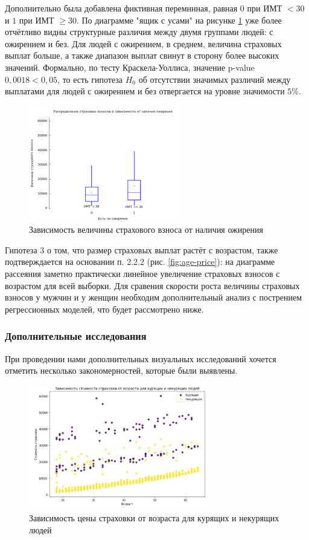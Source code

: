 \documentclass[a4paper,12pt]{article}
\begin{document}
Дополнительно была добавлена фиктивная перемннная, равная $0$ при ИМТ $<30$ и $1$ при ИМТ $\ge30$. По диаграмме "ящик с усами" на рисунке \ref{fig:is_fat} уже более отчётливо видны структурные различия между двумя группами людей: с ожирением и без. Для людей с ожирением, в среднем, величина страховых выплат больше, а также диапазон выплат свинут в сторону более высоких значений. Формально, по тесту Краскела-Уоллиса, значение p-value $0,0018 < 0,05$, то есть гипотеза $H_0$ об отсутствии значимых различий между выплатами для людей с ожирением и без отвергается на уровне значимости $5\%.$

\begin{figure}[H]
	\includegraphics[width=0.6\textwidth]{../[graphics]/is_fat.png}
	\centering
	\caption{Зависимость величины страхового взноса от наличия ожирения}
	\label{fig:is_fat}
\end{figure}

Гипотеза 3 о том, что размер страховых выплат растёт с возрастом, также подтверждается на основании п. 2.2.2 (рис. \ref{fig:age-price}): на диаграмме рассеяния заметно практически линейное увеличение страховых взносов с возрастом для всей выборки. Для сравения скорости роста величины страховых взносов у мужчин и у женщин необходим дополнительный анализ с пострением регрессионных моделей, что будет рассмотрено ниже.

\subsubsection{Дополнительные исследования}

При проведении нами дополнительных визуальных исследований хочется отметить несколько закономерностей, которые были выявлены.

\begin{figure}[H]
	\includegraphics[width=0.7\textwidth]{../[graphics]/age-charges-smoker.jpg}
	\centering
	\caption{Зависимость цены страховки от возраста для курящих и некурящих людей}
	\label{fig:age-charges-smoker}
\end{figure}
\end{document}
